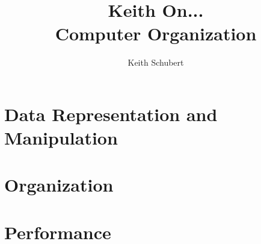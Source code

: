 \documentclass[]{book}
\title{
{\Large Keith On...} \\
{\huge Computer Organization}
}
\author{
  Keith Schubert%
}
\date{}
\begin{document}
\normalbaselineskip

\maketitle

\tableofcontents



%
%
%
%
%
%
%
%
%
%
%
%
\part{Data Representation and Manipulation}









\part{Organization}









\part{Performance}






\appendix


%
%
%
%
%
%




\end{document}
